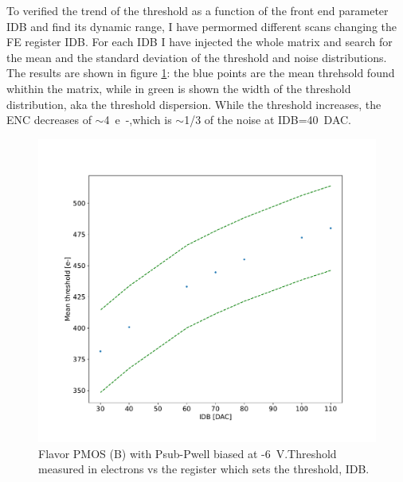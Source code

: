        To verified the trend of the threshold as a function of the front end parameter IDB and find its dynamic range, I have permormed different scans changing the FE register IDB. For each IDB I have injected the whole matrix and search for the mean and the standard deviation of the threshold and noise distributions. The results are shown in figure \ref{fig:threshold_vs_IDB}: the blue points are the mean threhsold found whithin the matrix, while in green is shown the width of the threshold distribution, aka the threshold dispersion. 
        While the threshold increases, the ENC decreases of $\sim$\SI{4}{e-},which is $\sim$1/3 of the noise at IDB=\SI{40}{DAC}. 
        \begin{figure}[h!]
            \centering
            \includegraphics[width=.70\linewidth]{figures/charaterization/thr_vs_IDB.pdf}
            \caption{Flavor PMOS (B) with Psub-Pwell biased at -\SI{6}{V}.Threshold measured in electrons vs the register which sets the threshold, IDB.  }
            \label{fig:threshold_vs_IDB}
        \end{figure}            


